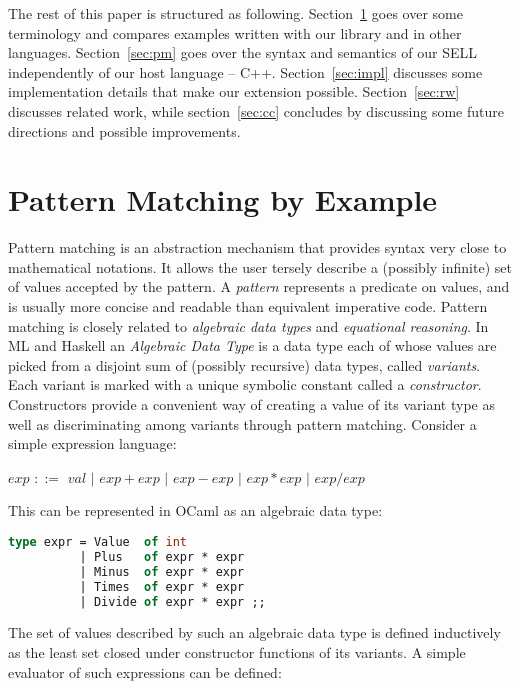 \documentclass{llncs}
\newcommand{\Alt}{\ensuremath{|}}
\newcommand{\is}{$::=$}
\begin{document}
The rest of this paper is structured as following. Section~\ref{sec:bg} goes 
over some terminology and compares examples written with our library and in 
other languages. Section~\ref{sec:pm} goes over the syntax and semantics of our 
SELL independently of our host language -- C++. Section~\ref{sec:impl} discusses 
some implementation details that make our extension possible. 
Section~\ref{sec:rw} discusses related work, while section~\ref{sec:cc} 
concludes by discussing some future directions and possible improvements.

\section{Pattern Matching by Example} %
\label{sec:bg}

Pattern matching is an abstraction mechanism that provides syntax very close to 
mathematical notations. It allows the user tersely describe a (possibly 
infinite) set of values accepted by the pattern. A \emph{pattern} represents a 
predicate on values, and is usually more concise and readable than equivalent 
imperative code. Pattern matching is closely related to \emph{algebraic data 
types} and \emph{equational reasoning}. 
In ML and Haskell an \emph{Algebraic Data Type} is a data type 
each of whose values are picked from a disjoint sum of (possibly recursive) data 
types, called \emph{variants}. Each variant is marked with a unique 
symbolic constant called a \emph{constructor}. Constructors provide a convenient 
way of creating a value of its variant type as well as discriminating among 
variants through pattern matching. Consider a simple expression language:
\begin{center}
$exp$ \is{} $val$ \Alt{} $exp+exp$ \Alt{} $exp-exp$ \Alt{} $exp*exp$ \Alt{} $exp/exp$
\end{center}

\noindent
This can be represented in OCaml as an algebraic data type:

\begin{lstlisting}[language=Caml,keepspaces,columns=flexible]
type expr = Value  of int 
          | Plus   of expr * expr 
          | Minus  of expr * expr 
          | Times  of expr * expr 
          | Divide of expr * expr ;;
\end{lstlisting}

\noindent
The set of values described by such an algebraic data type is defined 
inductively as the least set closed under constructor functions of its variants.
A simple evaluator of such expressions can be defined:
\end{document}
